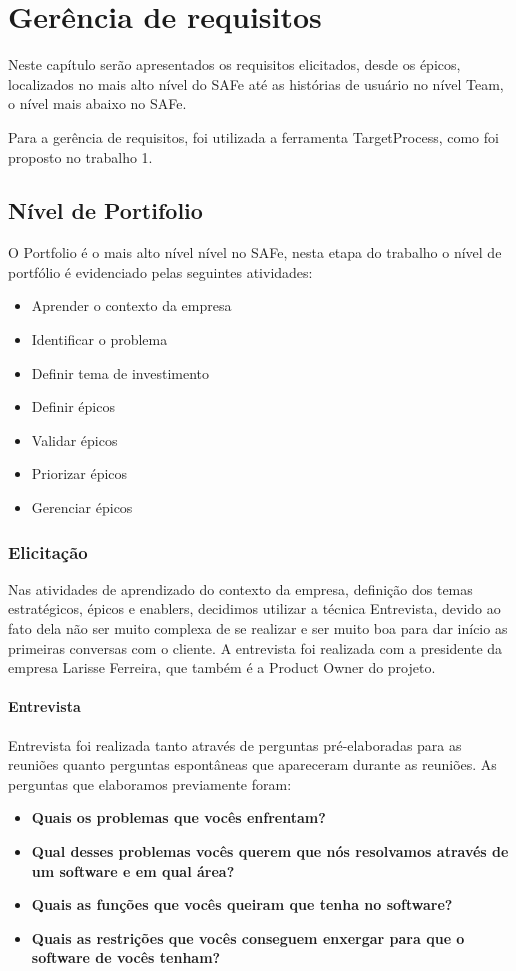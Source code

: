 \chapter{Gerência de requisitos}

  Neste capítulo serão apresentados os requisitos elicitados, desde os épicos, localizados no mais alto nível do SAFe até as
  histórias de usuário no nível Team, o nível mais abaixo no SAFe.

  Para a gerência de requisitos, foi utilizada a ferramenta TargetProcess, como foi proposto no trabalho 1.

\section{Nível de Portifolio}

  O Portfolio é o mais alto nível nível no SAFe, nesta etapa do trabalho o nível de portfólio é evidenciado pelas seguintes atividades:

  \begin{itemize}
    \item Aprender o contexto da empresa
    \item Identificar o problema
    \item Definir tema de investimento
    \item Definir épicos
    \item Validar épicos
    \item Priorizar épicos
    \item Gerenciar épicos
  \end{itemize}
\subsection{Elicitação}
  Nas atividades de aprendizado do contexto da empresa, definição dos temas estratégicos, épicos e enablers, decidimos utilizar a técnica Entrevista, devido ao fato dela não ser muito complexa de se realizar e ser muito boa para dar início as primeiras conversas com o cliente.
  A entrevista foi realizada com a presidente da empresa Larisse Ferreira, que também é a Product Owner do projeto.
\subsubsection{Entrevista}
  Entrevista foi realizada tanto através de perguntas pré-elaboradas para as reuniões quanto perguntas espontâneas que apareceram durante as reuniões. As perguntas que elaboramos previamente foram:
  \begin{itemize}
    \item \textbf{Quais os problemas que vocês enfrentam?}
    \item \textbf{Qual desses problemas vocês querem que nós resolvamos através de um software e em qual área?}
    \item \textbf{Quais as funções que vocês queiram que tenha no software?}
    \item \textbf{Quais as restrições que vocês conseguem enxergar para que o software de vocês tenham?}
  \end{itemize}


